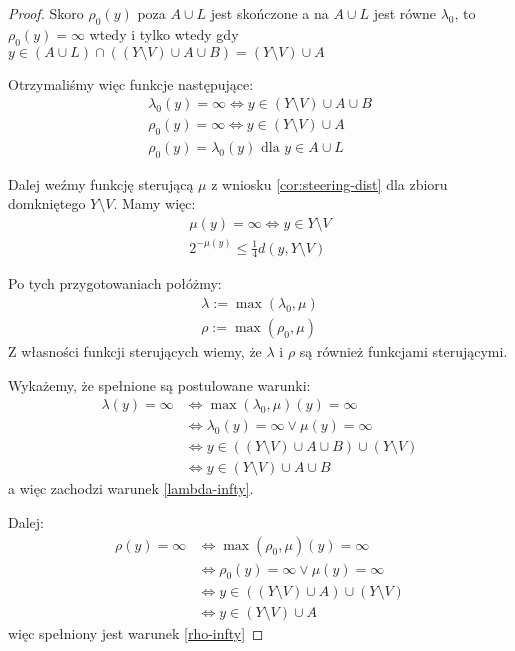\begin{lem}
\begin{proof}
    Skoro $\rho_0(y)$ poza $A \cup L$ jest skończone a na $A \cup L$ jest równe $\lambda_0$, to $\rho_0(y) = \infty$ wtedy i tylko wtedy gdy $y \in (A \cup L) \cap ((Y \setminus V) \cup A \cup B) = (Y \setminus V) \cup A$
    
    Otrzymaliśmy więc funkcje następujące:
    \begin{gather}
      \lambda_0(y) = \infty \Leftrightarrow y \in (Y \setminus V) \cup A \cup B \\
      \rho_0(y) = \infty \Leftrightarrow y \in (Y \setminus V) \cup A \\
      \label{rho0-eq-lambda0} \rho_0(y) = \lambda_0(y) \mbox{ dla } y \in A \cup L
    \end{gather}
    
    Dalej weźmy funkcję sterującą $\mu$ z wniosku \ref{cor:steering-dist} dla zbioru domkniętego $Y \setminus V$. Mamy więc:
    \begin{gather}
      \mu(y) = \infty \Leftrightarrow y \in Y \setminus V \\
      2^{-\mu(y)} \leq \frac{1}{4} d(y, Y \setminus V)
    \end{gather}
    
    Po tych przygotowaniach połóżmy:
    \begin{gather*}
      \lambda := \max(\lambda_0, \mu) \\
      \rho := \max(\rho_0, \mu)
    \end{gather*}
    Z własności funkcji sterujących wiemy, że $\lambda$ i $\rho$ są również funkcjami sterującymi.
    
    Wykażemy, że spełnione są postulowane warunki:
    \begin{align*}
     \lambda(y) = \infty & \Leftrightarrow \max(\lambda_0, \mu)(y) = \infty \\
     & \Leftrightarrow \lambda_0(y) = \infty \vee \mu(y) = \infty \\
     & \Leftrightarrow y \in ((Y \setminus V) \cup A \cup B) \cup (Y \setminus V) \\
     & \Leftrightarrow y \in (Y \setminus V) \cup A \cup B
    \end{align*}
    a więc zachodzi warunek \eqref{lambda-infty}.
    
    Dalej:
    \begin{align*}
      \rho(y) = \infty & \Leftrightarrow \max(\rho_0, \mu)(y) = \infty \\
      & \Leftrightarrow \rho_0(y) = \infty \vee \mu(y) = \infty \\
      & \Leftrightarrow y \in ((Y \setminus V) \cup A) \cup (Y \setminus V) \\
      & \Leftrightarrow y \in (Y \setminus V) \cup A
    \end{align*}
    więc spełniony jest warunek \eqref{rho-infty}
    

\end{proof}
\end{lem}
